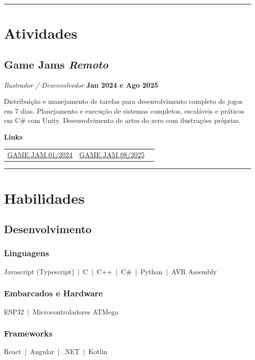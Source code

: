 \documentclass[a4paper,10pt]{article}
\newcommand{\sectionend}{
  \par\addvspace{0.75em}
  \hrule
  \addvspace{0.75em}
}
\newcommand{\company}[1]{{\bfseries #1}}
\newcommand{\place}[1]{{\itshape #1}}
\newcommand{\role}[1]{{\itshape\color{muted}#1}}
\newcommand{\daterange}[1]{{\small\bfseries\color{muted}#1}}
\begin{document}
\sectionend


\section{Atividades} 

    \subsection*{\texorpdfstring{
    \company{Game Jams}
    \hfill
    \place{Remoto}
    }{
      Game Jams -- Remoto
    }}
    \par
    \role{Ilustrador / Desenvolvedor}
    \hfill
    \daterange{Jan 2024 e Ago 2025}
        
    Distribuição e manejamento de tarefas para desenvolvimento completo de jogos em 7 dias. Planejamento e execução de sistemas completos, escaláveis e práticos em C\# com Unity.
    Desenvolvimento de artes do zero com ilustrações próprias.
    
    \textbf{Links}
    
    \par
    {\ttfamily
    \begin{tabular*}{\linewidth}{@{\extracolsep{\fill}} c c c }
    \href{https://arthurpalladino.itch.io/nothing-can-go-wrong-at-the-theater}{GAME JAM 01/2024} & 
    \href{https://arthurpalladino.itch.io/take-a-risk-or-get-cut-off}{GAME JAM 08/2025}
    \end{tabular*}
    }
    
\sectionend

\section{Habilidades}
    \subsection*{Desenvolvimento}
        \subsubsection*{Linguagens}
        {\ttfamily 
            Javascript (Typescript) \,|\, 
            C \,|\, 
            C++ \,|\, 
            C\# \,|\, 
            Python \,|\, 
            AVR Assembly
        }
        \subsubsection*{Embarcados e Hardware}
        {\ttfamily
        ESP32 \,|\, 
        Microcontroladores ATMega
        \subsubsection*{Frameworks}
        React \,|\, 
        Angular \,|\, 
        .NET \,|\, 
        Kotlin
        }
    \vspace{0.2em}
\end{document}
